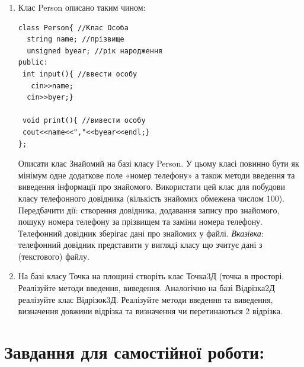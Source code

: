 \documentclass[a5paper,titlepage,openany,twoside,draft]{book_unv}%
\begin{document}
\begin{enumerate}
\def\labelenumi{\arabic{enumi})}

\item
Клас Person описано таким чином:
\begin{verbatim}
class Person{ //Клас Особа
  string name; //прізвище
  unsigned byear; //рік народження
public:
 int input(){ //ввести особу
   cin>>name;
  cin>>byer;}

 void print(){ //вивести особу
 cout<<name<<","<<byear<<endl;}
};
\end{verbatim}

  Описати клас Знайомий на базі класу Person. У цьому класі повинно бути 
як мінімум одне додаткове поле «номер
телефону» а також методи введення та виведення інформації про знайомого. 
Використати цей клас для побудови класу телефонного довідника (кількість
знайомих обмежена числом 100). Передбачити дії: створення довідника, додавання запису про знайомого,
пошуку номера телефону за прізвищем та заміни номера телефону. 
Телефонний довідник зберігає дані про знайомих у файлі.
\emph{\emph{Вказівка}}: телефонний довідник представити у вигляді класу
що зчитує дані з (текстового) файлу.

\item
  На базі класу Точка на площині створіть клас Точка3Д (точка
  в просторі. Реалізуйте методи введення, виведення. Аналогічно на базі
  Відрізка2Д реалізуйте клас Відрізок3Д. Реалізуйте методи
  введення та виведення, визначення довжини відрізка та
  визначення чи перетинаються 2 відрізка.

\end{enumerate}

\section{Завдання для самостійної роботи:}
\end{document}
